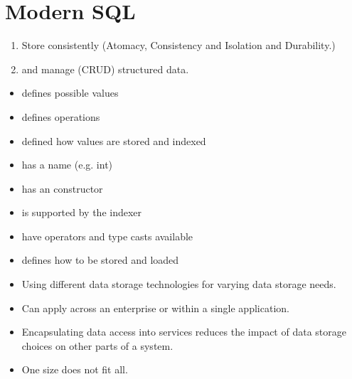\section{Modern SQL}
\begin{breakbox}
\begin{enumerate}
	\item Store consistently (\textcolor{Emerald}{A}tomacy, \textcolor{Emerald}{C}onsistency and \textcolor{Emerald}{I}solation and \textcolor{Emerald}{D}urability.)
	\item and manage (CRUD) structured data.
\end{enumerate}
\end{breakbox}

\begin{breakbox}
	\begin{itemize}
		\item defines possible values
		\item defines operations
		\item defined how values are stored and indexed
		\item has a name (e.g. int)
		\item has an constructor
		\item is supported by the indexer
		\item have operators and type casts available
		\item defines how to be stored and loaded
	\end{itemize}
\end{breakbox}

\begin{breakbox}
	\begin{itemize}
		\item Using different data storage technologies for varying data storage needs.
		\item Can apply across an enterprise or within a single application.
		\item Encapsulating data access into services reduces the impact of data storage choices on other parts of a system.
		\item One size does not fit all.
	\end{itemize}
\end{breakbox}
